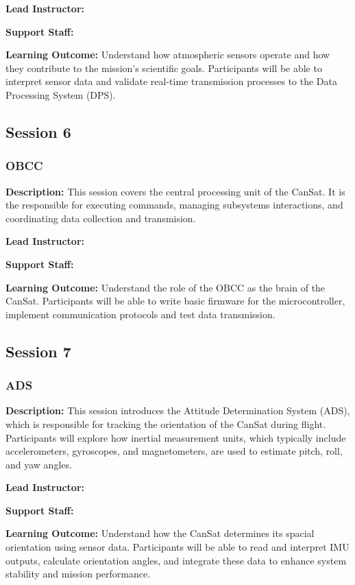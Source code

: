 \documentclass[a4paper,12pt]{article}
\begin{document}
\textbf{Lead Instructor:}

\textbf{Support Staff: }

\textbf{Learning Outcome:} Understand how atmospheric sensors operate and how they contribute to the mission’s scientific goals. Participants will be able to interpret sensor data and validate real-time transmission processes to the Data Processing System (DPS).

\newpage

\subsection{Session 6}
\subsubsection{OBCC}

\textbf{Description:} This session covers the central processing unit of the CanSat. It is the responsible for executing commands, managing subsystems interactions, and coordinating data collection and transmision.

\textbf{Lead Instructor:}

\textbf{Support Staff: }

\textbf{Learning Outcome:} Understand the role of the OBCC as the brain of the CanSat. Participants will be able to write basic firmware for the microcontroller, implement communication protocols and test data transmission.

\newpage

\subsection{Session 7}
\subsubsection{ADS}

\textbf{Description:} This session introduces the Attitude Determination System (ADS), which is responsible for tracking the orientation of the CanSat during flight. Participants will explore how inertial measurement units, which typically include accelerometers, gyroscopes, and magnetometers, are used to estimate pitch, roll, and yaw angles.



\textbf{Lead Instructor:}

\textbf{Support Staff: }

\textbf{Learning Outcome:} Understand how the CanSat determines its spacial orientation using sensor data. Participants will be able to read and interpret IMU outputs, calculate orientation angles, and integrate these data to enhance system stability and mission performance.
\newpage
\end{document}
